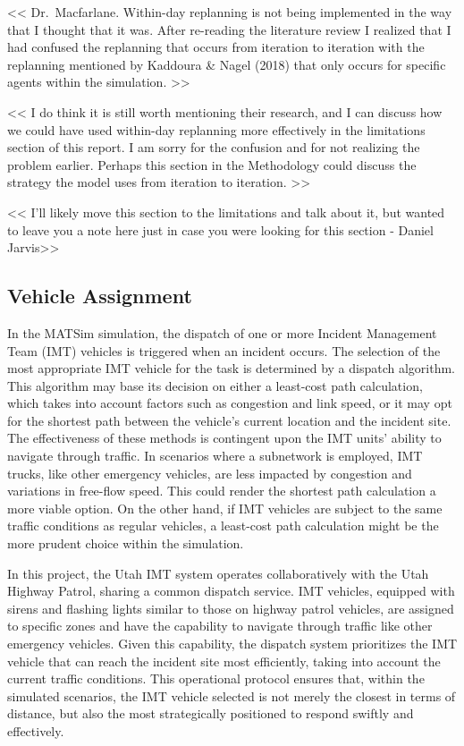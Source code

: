 \documentclass[fancy, oneside, mastersfancy, ms]{byuthesis}
\begin{document}
\textless\textless{} Dr.~Macfarlane. Within-day replanning is not being
implemented in the way that I thought that it was. After re-reading the
literature review I realized that I had confused the replanning that
occurs from iteration to iteration with the replanning mentioned by
Kaddoura \& Nagel (2018) that only occurs for specific agents within the
simulation. \textgreater\textgreater{}

\textless\textless{} I do think it is still worth mentioning their
research, and I can discuss how we could have used within-day replanning
more effectively in the limitations section of this report. I am sorry
for the confusion and for not realizing the problem earlier. Perhaps
this section in the Methodology could discuss the strategy the model
uses from iteration to iteration. \textgreater\textgreater{}

\textless\textless{} I'll likely move this section to the limitations
and talk about it, but wanted to leave you a note here just in case you
were looking for this section - Daniel Jarvis\textgreater\textgreater{}

\hypertarget{vehicle-assignment}{%
\subsection{Vehicle Assignment}\label{vehicle-assignment}}

In the MATSim simulation, the dispatch of one or more Incident
Management Team (IMT) vehicles is triggered when an incident occurs. The
selection of the most appropriate IMT vehicle for the task is determined
by a dispatch algorithm. This algorithm may base its decision on either
a least-cost path calculation, which takes into account factors such as
congestion and link speed, or it may opt for the shortest path between
the vehicle's current location and the incident site. The effectiveness
of these methods is contingent upon the IMT units' ability to navigate
through traffic. In scenarios where a subnetwork is employed, IMT
trucks, like other emergency vehicles, are less impacted by congestion
and variations in free-flow speed. This could render the shortest path
calculation a more viable option. On the other hand, if IMT vehicles are
subject to the same traffic conditions as regular vehicles, a least-cost
path calculation might be the more prudent choice within the simulation.

In this project, the Utah IMT system operates collaboratively with the
Utah Highway Patrol, sharing a common dispatch service. IMT vehicles,
equipped with sirens and flashing lights similar to those on highway
patrol vehicles, are assigned to specific zones and have the capability
to navigate through traffic like other emergency vehicles. Given this
capability, the dispatch system prioritizes the IMT vehicle that can
reach the incident site most efficiently, taking into account the
current traffic conditions. This operational protocol ensures that,
within the simulated scenarios, the IMT vehicle selected is not merely
the closest in terms of distance, but also the most strategically
positioned to respond swiftly and effectively.
\end{document}
